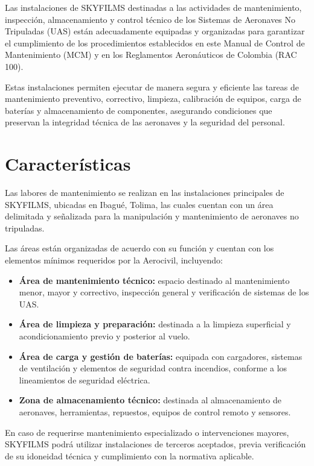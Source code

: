 
Las instalaciones de SKYFILMS destinadas a las actividades de mantenimiento, inspección, almacenamiento y control técnico de los Sistemas de Aeronaves No Tripuladas (UAS) están adecuadamente equipadas y organizadas para garantizar el cumplimiento de los procedimientos establecidos en este Manual de Control de Mantenimiento (MCM) y en los Reglamentos Aeronáuticos de Colombia (RAC 100).

Estas instalaciones permiten ejecutar de manera segura y eficiente las tareas de mantenimiento preventivo, correctivo, limpieza, calibración de equipos, carga de baterías y almacenamiento de componentes, asegurando condiciones que preservan la integridad técnica de las aeronaves y la seguridad del personal.

\section{Características}
Las labores de mantenimiento se realizan en las instalaciones principales de SKYFILMS, ubicadas en Ibagué, Tolima, las cuales cuentan con un área delimitada y señalizada para la manipulación y mantenimiento de aeronaves no tripuladas.

Las áreas están organizadas de acuerdo con su función y cuentan con los elementos mínimos requeridos por la Aerocivil, incluyendo:

\begin{itemize}
    \item \textbf{Área de mantenimiento técnico:} espacio destinado al mantenimiento menor, mayor y correctivo, inspección general y verificación de sistemas de los UAS.
    
    \item \textbf{Área de limpieza y preparación:} destinada a la limpieza superficial y acondicionamiento previo y posterior al vuelo.
    
    \item \textbf{Área de carga y gestión de baterías:} equipada con cargadores, sistemas de ventilación y elementos de seguridad contra incendios, conforme a los lineamientos de seguridad eléctrica.

    \item \textbf{Zona de almacenamiento técnico:} destinada al almacenamiento de aeronaves, herramientas, repuestos, equipos de control remoto y sensores.


\end{itemize}

En caso de requerirse mantenimiento especializado o intervenciones mayores, SKYFILMS podrá utilizar instalaciones de terceros aceptados, previa verificación de su idoneidad técnica y cumplimiento con la normativa aplicable.\\


